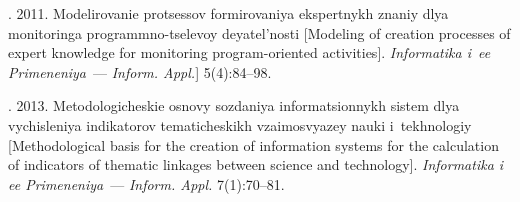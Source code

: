 \begin{multicols}{2}
{{\begin{thebibliography}{99}
. 2011. Modelirovanie protsessov
formirovaniya
ekspertnykh znaniy dlya mo\-ni\-to\-rin\-ga pro\-grammno-tselevoy de\-yatel'\-nosti
[Modeling of
creation processes of expert knowledge for monitoring program-oriented activities].
\textit{Informatika i~ee Primeneniya}~--- \textit{Inform. Appl.}] 5(4):84--98.

. 2013.
Metodologicheskie osnovy sozdaniya informatsionnykh sistem dlya vychisleniya
indikatorov tematicheskikh vzaimosvyazey nauki i~tekhnologiy [Methodological basis for
the creation of information systems for the calculation of indicators
of thematic  linkages between science and technology]. \textit{Informatika i ee Primeneniya}~--- \textit{Inform. Appl.}
7(1):70--81.


\end{thebibliography}}}
\end{multicols}

